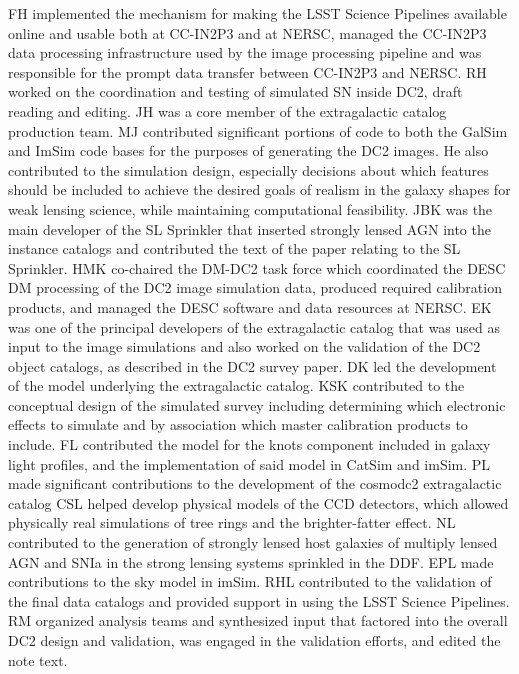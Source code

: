 \documentclass[modern]{descnote}
\begin{document}
%
FH implemented the mechanism for making the LSST Science Pipelines available online and usable both at CC-IN2P3 and at NERSC, managed the CC-IN2P3 data processing infrastructure used by the image processing pipeline and was responsible for the prompt data transfer between CC-IN2P3 and NERSC.
%
RH worked on the coordination and testing of simulated SN inside DC2, draft reading and editing.
%
JH was a core member of the extragalactic catalog production team.
%
MJ contributed significant portions of code to both the GalSim and ImSim code bases for the purposes of generating the DC2 images.  He also contributed to the simulation design, especially decisions about which features should be included to achieve the desired goals of realism in the galaxy shapes for weak lensing science, while maintaining computational feasibility.
%
JBK was the main developer of the SL Sprinkler that inserted strongly lensed AGN into the instance catalogs and contributed the text of the paper relating to the SL Sprinkler.
%
HMK co-chaired the DM-DC2 task force which coordinated the DESC DM processing of the DC2 image simulation data, produced required calibration products, and managed the DESC software and data resources at NERSC.
%
EK was one of the principal developers of the extragalactic catalog that was used as input to the image simulations and also worked on the validation of the DC2 object catalogs, as described in the DC2 survey paper.
%
DK led the development of the model underlying the extragalactic catalog.
%
KSK contributed to the conceptual design of the simulated survey including determining which electronic effects to simulate and by association which master calibration products to include.
%
FL contributed the model for the knots component included in galaxy light profiles, and the implementation of said model in CatSim and imSim.
%
PL made significant contributions to the development of the cosmodc2 extragalactic catalog
%
CSL helped develop physical models of the CCD detectors, which allowed physically real simulations of tree rings and the brighter-fatter effect.
%
NL contributed to the generation of strongly lensed host galaxies of multiply lensed AGN and SNIa in the strong lensing systems sprinkled in the DDF.
%
EPL made contributions to the sky model in imSim. 
%
RHL contributed to the validation of the final data catalogs and provided support in using the LSST Science Pipelines.
%
RM organized analysis teams and synthesized input that factored into the overall DC2 design and validation, was engaged in the validation efforts, and edited the note text. 
%
\end{document}
